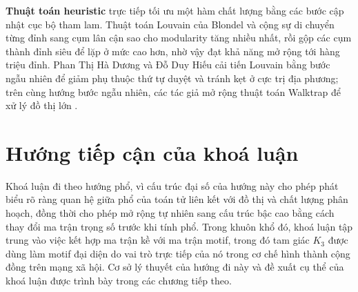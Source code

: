 \textbf{Thuật toán heuristic} trực tiếp tối ưu một hàm chất lượng bằng các bước cập nhật cục bộ tham lam. Thuật toán Louvain của Blondel và cộng sự \cite{blondel2008} di chuyển từng đỉnh sang cụm lân cận sao cho modularity tăng nhiều nhất, rồi gộp các cụm thành đỉnh siêu để lặp ở mức cao hơn, nhờ vậy đạt khả năng mở rộng tới hàng triệu đỉnh. Phan Thị Hà Dương và Đỗ Duy Hiếu \cite{do2025louvain} cải tiến Louvain bằng bước ngẫu nhiên để giảm phụ thuộc thứ tự duyệt và tránh kẹt ở cực trị địa phương; trên cùng hướng bước ngẫu nhiên, các tác giả mở rộng thuật toán Walktrap để xử lý đồ thị lớn \cite{do2022walktrap}.

\section{Hướng tiếp cận của khoá luận}
\label{sec:huong-khoa-luan}

Khoá luận đi theo hướng phổ, vì cấu trúc đại số của hướng này cho phép phát biểu rõ ràng quan hệ giữa phổ của toán tử liên kết với đồ thị và chất lượng phân hoạch, đồng thời cho phép mở rộng tự nhiên sang cấu trúc bậc cao bằng cách thay đổi ma trận trọng số trước khi tính phổ. Trong khuôn khổ đó, khoá luận tập trung vào việc kết hợp ma trận kề với ma trận motif, trong đó tam giác $K_3$ được dùng làm motif đại diện do vai trò trực tiếp của nó trong cơ chế hình thành cộng đồng trên mạng xã hội. Cơ sở lý thuyết của hướng đi này và đề xuất cụ thể của khoá luận được trình bày trong các chương tiếp theo.
